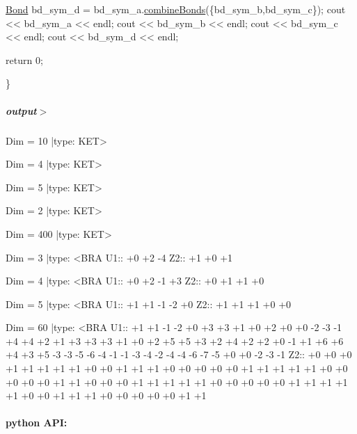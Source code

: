 \begin{DoxyCodeInclude}
    \hyperlink{classcytnx_1_1Bond}{Bond} bd\_sym\_d = bd\_sym\_a.\hyperlink{classcytnx_1_1Bond_a4a1d060cf2d0c44d83356df757a802d1}{combineBonds}(\{bd\_sym\_b,bd\_sym\_c\});
    cout << bd\_sym\_a << endl;
    cout << bd\_sym\_b << endl;
    cout << bd\_sym\_c << endl;
    cout << bd\_sym\_d << endl;

    \textcolor{keywordflow}{return} 0;
    


\}

\end{DoxyCodeInclude}
 \subparagraph*{output$>$}


\begin{DoxyVerbInclude}
Dim = 10 |type: KET>     

Dim = 4 |type: KET>     

Dim = 5 |type: KET>     

Dim = 2 |type: KET>     

Dim = 400 |type: KET>     

Dim = 3 |type: <BRA     
 U1::  +0 +2 -4
 Z2::  +1 +0 +1

Dim = 4 |type: <BRA     
 U1::  +0 +2 -1 +3
 Z2::  +0 +1 +1 +0

Dim = 5 |type: <BRA     
 U1::  +1 +1 -1 -2 +0
 Z2::  +1 +1 +1 +0 +0

Dim = 60 |type: <BRA     
 U1::  +1 +1 -1 -2 +0 +3 +3 +1 +0 +2 +0 +0 -2 -3 -1 +4 +4 +2 +1 +3 +3 +3 +1 +0 +2 +5 +5 +3 +2 +4 +2 +2 +0 -1 +1 +6 +6 +4 +3 +5 -3 -3 -5 -6 -4 -1 -1 -3 -4 -2 -4 -4 -6 -7 -5 +0 +0 -2 -3 -1
 Z2::  +0 +0 +0 +1 +1 +1 +1 +1 +0 +0 +1 +1 +1 +0 +0 +0 +0 +0 +1 +1 +1 +1 +1 +0 +0 +0 +0 +0 +1 +1 +0 +0 +0 +1 +1 +1 +1 +1 +0 +0 +0 +0 +0 +1 +1 +1 +1 +1 +0 +0 +1 +1 +1 +0 +0 +0 +0 +0 +1 +1

\end{DoxyVerbInclude}
 \paragraph*{python A\+PI\+:}


